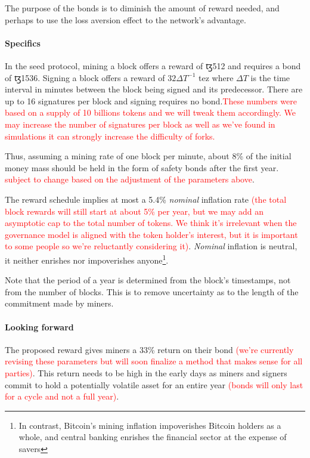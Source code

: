 \documentclass[letterpaper]{article}
\newcommand\change[1]{\textcolor{red}{#1}}
\newcommand{\tz}{{\fontspec{DejaVu Sans} \small{ꜩ}}}
\begin{document}
The purpose of the bonds is to diminish the amount of reward needed, and perhaps
to use the loss aversion effect to the network's advantage.


\paragraph{Specifics}
In the seed protocol, mining a block offers a reward of \tz\num{512} and
requires a bond of \tz\num{1536}. Signing a block offers a reward of
$32\Delta T^{-1}$ tez where $\Delta T$ is the time interval in minutes between
the block being signed and its predecessor. There are up to 16 signatures per block
and signing requires no bond.\change{These numbers were based on a supply of 10 billions
  tokens and we will tweak them accordingly. We may increase the number of signatures
  per block as well as we've found in simulations it can strongly increase
  the difficulty of forks.}

Thus, assuming a mining rate of one block per minute, about 8\% of the initial
money mass should be held in the form of safety bonds after the first year.
\change{subject to change based on the adjustment of the parameters above}.

The reward schedule implies at most a 5.4\% \emph{nominal} inflation
rate \change {(the total block rewards will still start at about 5\% per year, but we may add an asymptotic cap to the total number of tokens. We think it’s irrelevant when the governance model is aligned with the token holder’s interest, but it is important to some people so we’re reluctantly considering it)}. \emph{Nominal} inflation is neutral, it neither enrishes nor
impoverishes anyone\footnote{In contrast, Bitcoin's mining inflation impoverishes
  Bitcoin holders as a whole, and central banking enrishes the financial
  sector at the expense of savers}.

Note that the period of a year is determined from the block's timestamps, not
from the number of blocks. This is to remove uncertainty as to the length of
the commitment made by miners. 

\paragraph{Looking forward}
The proposed reward gives miners a 33\% return on their bond \change {(we're currently revising these parameters but will soon finalize a method that makes sense for all parties)}.
This return needs to be high in the early days as miners and signers commit
to hold a potentially volatile asset for an entire year \change {(bonds will only last for a cycle and not a full year)}.
\end{document}
